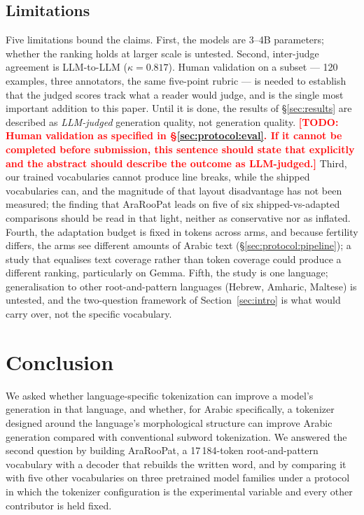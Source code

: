 \documentclass[a4paper,fleqn]{cas-sc}
\newcommand{\todo}[1]{\textcolor{red}{\textbf{[\textsc{TODO}: #1]}}}
\begin{document}
\subsection{Limitations}
\label{sec:discussion:limitations}

Five limitations bound the claims. First, the models are 3--4B parameters; whether the ranking holds at larger scale is untested. Second, inter-judge agreement is LLM-to-LLM ($\kappa = 0.817$). Human validation on a subset --- 120 examples, three annotators, the same five-point rubric --- is needed to establish that the judged scores track what a reader would judge, and is the single most important addition to this paper. Until it is done, the results of \S\ref{sec:results} are described as \emph{LLM-judged} generation quality, not generation quality.
\todo{Human validation as specified in \S\ref{sec:protocol:eval}. If it cannot be completed before submission, this sentence should state that explicitly and the abstract should describe the outcome as LLM-judged.}
Third, our trained vocabularies cannot produce line breaks, while the shipped vocabularies can, and the magnitude of that layout disadvantage has not been measured; the finding that AraRooPat leads on five of six shipped-vs-adapted comparisons should be read in that light, neither as conservative nor as inflated. Fourth, the adaptation budget is fixed in tokens across arms, and because fertility differs, the arms see different amounts of Arabic text (\S\ref{sec:protocol:pipeline}); a study that equalises text coverage rather than token coverage could produce a different ranking, particularly on Gemma. Fifth, the study is one language; generalisation to other root-and-pattern languages (Hebrew, Amharic, Maltese) is untested, and the two-question framework of Section~\ref{sec:intro} is what would carry over, not the specific vocabulary.

\section{Conclusion}
\label{sec:conclusion}

We asked whether language-specific tokenization can improve a model's generation in that language, and whether, for Arabic specifically, a tokenizer designed around the language's morphological structure can improve Arabic generation compared with conventional subword tokenization. We answered the second question by building AraRooPat, a 17\,184-token root-and-pattern vocabulary with a decoder that rebuilds the written word, and by comparing it with five other vocabularies on three pretrained model families under a protocol in which the tokenizer configuration is the experimental variable and every other contributor is held fixed.
\end{document}
